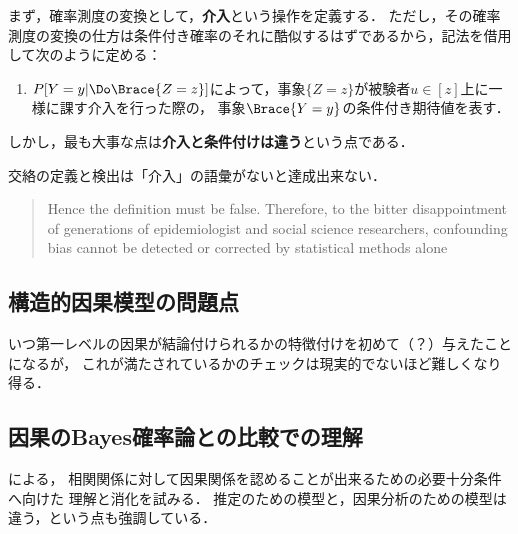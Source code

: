 \documentclass[uplatex,dvipdfmx]{jsreport}
\begin{document}
\begin{definition}[intervent]
    まず，確率測度の変換として，\textbf{介入}という操作を定義する．
    ただし，その確率測度の変換の仕方は条件付き確率のそれに酷似するはずであるから，記法を借用して次のように定める：
    \begin{enumerate}
        \item $P[Y=y|\Do\Brace{Z=z}]$によって，事象$\{Z=z\}$が被験者$u\in[z]$上に一様に課す介入を行った際の，
        事象$\Brace{Y=y}$の条件付き期待値を表す\cite{Pearl95-CausalDiagram}．
    \end{enumerate}
    しかし，最も大事な点は\textbf{介入と条件付けは違う}という点である．
\end{definition}

\begin{example}
    交絡の定義と検出は「介入」の語彙がないと達成出来ない．
    \begin{quote}
        Hence the definition must be false. Therefore, to the bitter
        disappointment of generations of epidemiologist and social science researchers,
        confounding bias cannot be detected or corrected by statistical methods alone \cite{Pearl-Overview09}
    \end{quote}
\end{example}

\subsection{構造的因果模型の問題点}

\begin{problem}
    いつ第一レベルの因果が結論付けられるかの特徴付けを初めて（？）与えたことになるが，
    これが満たされているかのチェックは現実的でないほど難しくなり得る\cite{Lindley02-SeeingAndDoing}．
\end{problem}

\subsection{因果のBayes確率論との比較での理解}

\begin{tcolorbox}[colframe=ForestGreen, colback=ForestGreen!10!white,breakable,colbacktitle=ForestGreen!40!white,coltitle=black,fonttitle=\bfseries\sffamily,
title=]
    \cite{Cox-Wermuth04-review}による，
    相関関係に対して因果関係を認めることが出来るための必要十分条件へ向けた
    理解と消化を試みる．
    推定のための模型と，因果分析のための模型は違う，という点も強調している．
\end{tcolorbox}
\end{document}
